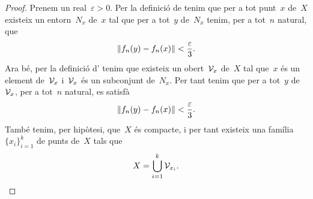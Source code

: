 \documentclass[../equacions-diferencials-I.tex]{subfiles}
\begin{document}
    \begin{proof}
        Prenem un real~\(\varepsilon>0\).
        Per la definició de  tenim que per a tot punt~\(x\) de~\(X\) existeix un entorn~\(N_{x}\) de~\(x\) tal que per a tot~\(y\) de~\(N_{x}\) tenim, per a tot~\(n\) natural, que
        \[
            \norm{f_{n}(y)-f_{n}(x)}<\frac{\varepsilon}{3}.
        \]
        Ara bé, per la definició d' tenim que existeix un obert~\(\mathcal{V}_{x}\) de~\(X\) tal que~\(x\) és un element de~\(\mathcal{V}_{x}\) i~\(\mathcal{V}_{x}\) és un subconjunt de~\(N_{x}\).
        Per tant tenim que per a tot~\(y\) de~\(\mathcal{V}_{x}\), per a tot~\(n\) natural, es satisfà
        \begin{equation}
            \label{thm:Teorema-dArzela-Ascoli:eq2}
            \norm{f_{n}(y)-f_{n}(x)}<\frac{\varepsilon}{3}.
        \end{equation}
        També tenim, per hipòtesi, que~\(X\) és compacte, i per tant existeix una família~\(\{x_{i}\}_{i=1}^{k}\) de punts de~\(X\) tals que
        \begin{equation}
            \label{thm:Teorema-dArzela-Ascoli:eq1}
            X=\bigcup_{i=1}^{k}\mathcal{V}_{x_{i}}.
        \end{equation}


\end{proof}
\end{document}
